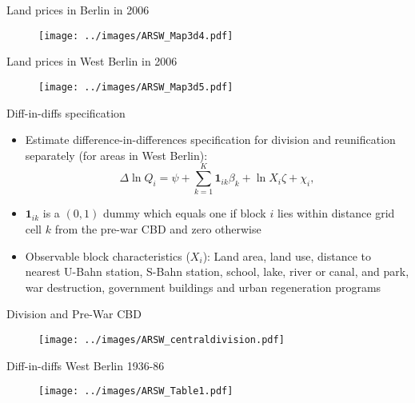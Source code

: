\documentclass[11pt,notes=hide,aspectratio=169]{beamer}
\begin{document}
\begin{frame}{Land prices in Berlin in 2006}
\begin{figure}
\centering
\texttt{[image: ../images/ARSW\_Map3d4.pdf]}
\end{figure}
\end{frame}
\begin{frame}{Land prices in West Berlin in 2006}
\begin{figure}
\centering
\texttt{[image: ../images/ARSW\_Map3d5.pdf]}
\end{figure}
\end{frame}
\begin{frame}{Diff-in-diffs specification}
\begin{itemize}
\item Estimate difference-in-differences specification for division and reunification separately (for areas in West Berlin):
\begin{equation*}
\Delta \ln Q_{i} = \psi + \sum_{k=1}^{K} \mathbf{1}_{ik} \beta_{k} + \ln X_{i} \zeta + \chi_{i},\label{emprent3}
\end{equation*}
\item $\mathbf{1}_{ik}$ is a $(0,1)$ dummy which equals one if block $i$ lies within distance grid cell $k$ from the pre-war CBD and zero otherwise
\item Observable block characteristics ($X_{i}$): Land area, land use, distance to nearest U-Bahn station, S-Bahn station, school, lake, river or canal, and park, war destruction, government buildings and urban regeneration programs
\end{itemize}
\end{frame}
\begin{frame}{Division and Pre-War CBD}
\begin{figure}
\centering
\texttt{[image: ../images/ARSW\_centraldivision.pdf]}
\end{figure}
\end{frame}
\begin{frame}{Diff-in-diffs West Berlin 1936-86}
\begin{figure}
\centering
\texttt{[image: ../images/ARSW\_Table1.pdf]}
\end{figure}
\end{frame}
\end{document}
